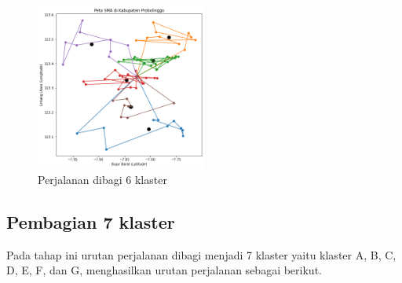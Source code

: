 \begin{figure}[H]
\centering
\includegraphics[width=0.5\textwidth]{Gambar/hasil_mtsp/6}
\caption{Perjalanan dibagi 6 klaster}
\label{fig:hasil_mtsp6}
\end{figure}

\subsection{Pembagian 7 klaster}

Pada tahap ini urutan perjalanan dibagi menjadi 7 klaster yaitu klaster A, B, C, D, E, F, dan G, menghasilkan urutan perjalanan sebagai berikut.

